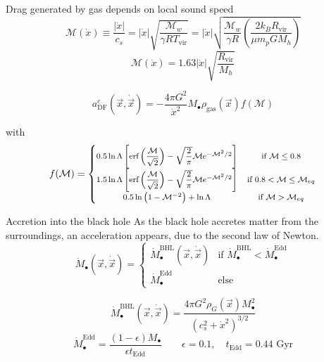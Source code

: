 \documentclass{beamer}
\newcommand{\erf}[1]{\text{erf}\left(#1\right)}
\begin{document}
\begin{frame}
	Drag generated by gas depends on local sound speed
	\begin{equation}
		\mathcal{M}(\dot{x}) \equiv \dfrac{|\dot{x}|}{c_s} = |\dot{x}|\sqrt{\dfrac{\mathcal{M}_w}{\gamma RT_\text{vir}}} = |\dot{x}|\sqrt{\dfrac{\mathcal{M}_w}{\gamma R}\left(\dfrac{2k_BR_\text{vir}}{\mu m_p G M_h}\right)}
	\end{equation}
	\begin{equation*}
		\mathcal{M}(\dot{x}) = 1.63|\dot{x}|\sqrt{\dfrac{R_\text{vir}}{M_h}}
	\end{equation*}
	
	\begin{equation}\label{eq: df_c}
	a^\text{c}_\text{DF}(\vec{x}, \dot{\vec{x}}) = -\dfrac{4\pi G^2}{\dot{x}^2}M_\bullet\rho_\text{gas}(\vec{x})f(\mathcal{M})
	\end{equation}
	
	with
	\begin{equation}\footnotesize
	f(\mathcal{M}) = \left\{
	\begin{matrix}
	0.5\ln\Lambda \left[\erf{\dfrac{\mathcal{M}}{\sqrt{2}}} - \sqrt{\dfrac{2}{\pi}}\mathcal{M}e^{-\mathcal{M}^2/2}\right]& \text{if $\mathcal{M} \leq 0.8$}\\
	1.5\ln\Lambda \left[\erf{\dfrac{\mathcal{M}}{\sqrt{2}}} - \sqrt{\dfrac{2}{\pi}}\mathcal{M}e^{-\mathcal{M}^2/2}\right] & \text{if $0.8 < \mathcal{M} \leq \mathcal{M}_{eq}$}\\
	0.5\ln\left(1 - \mathcal{M}^{-2}\right) + \ln\Lambda & \text{if $\mathcal{M} > \mathcal{M}_{eq}$}
	\end{matrix}
	\right.
	\end{equation}
\end{frame}

\begin{frame}{Accretion into the black hole}
	As the black hole accretes matter from the surroundings, an acceleration appears, due to the second law of Newton.
	\begin{equation}
		\dot{M}_\bullet(\vec{x}, \dot{\vec{x}}) = \left\{
		\begin{array}{lc}
		\dot{M}_\bullet^\text{BHL}(\vec{x}, \dot{\vec{x}}) & \text{if $\dot{M}_\bullet^\text{BHL} < \dot{M}_\bullet^\text{Edd}$} \\
		\dot{M}_\bullet^\text{Edd} & \text{else}
		\end{array}
		\right.
	\end{equation}
	
	\begin{equation}
		\dot{M}_\bullet^\text{BHL}(\vec{x}, \dot{\vec{x}}) = \dfrac{4\pi G^2 \rho_G(\vec{x})M^2_\bullet}{\left(c_s^2 + \dot{x}^2\right)^{3/2}} %
	\end{equation}
	\begin{equation}
		\dot{M}_\bullet^\text{Edd} = \dfrac{(1 - \epsilon)M_\bullet}{\epsilon t_\text{Edd}} \qquad \epsilon = 0.1, \quad t_\text{Edd} = 0.44 \text{ Gyr}
	\end{equation}
\end{frame}
\end{document}
